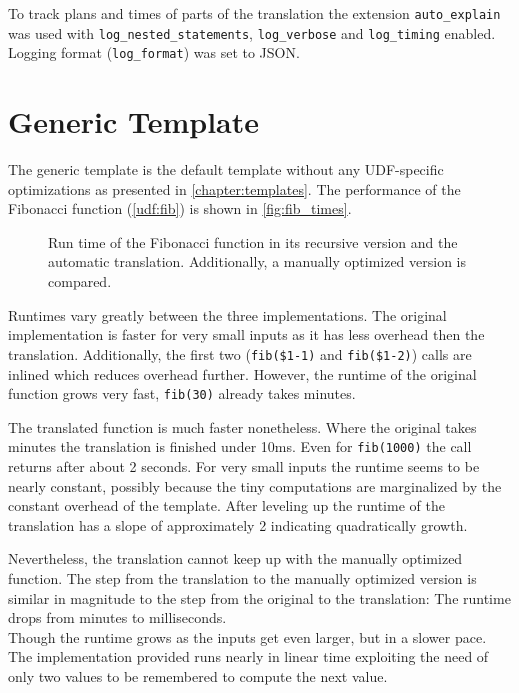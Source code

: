To track plans and times of parts of the translation the extension \texttt{auto\_explain} was used with \texttt{log\_nested\_statements}, \texttt{log\_verbose} and \texttt{log\_timing} enabled. Logging format (\texttt{log\_format}) was set to JSON.

\section{Generic Template}

The generic template is the default template without any UDF-specific optimizations as presented in \autoref{chapter:templates}. The performance of the Fibonacci function (\autoref{udf:fib}) is shown in \autoref{fig:fib_times}.

\begin{figure}[h!]
    \centering\footnotesize
    
    \caption{Run time of the Fibonacci function in its recursive version and the automatic translation. Additionally, a manually optimized version is compared.}
    \label{fig:fib_times}
\end{figure}

Runtimes vary greatly between the three implementations. The original implementation is faster for very small inputs as it has less overhead then the translation. Additionally, the first two (\texttt{fib(\$1-1)} and \texttt{fib(\$1-2)}) calls are inlined which reduces overhead further. However, the runtime of the original function grows very fast, \texttt{fib(30)} already takes minutes.

The translated function is much faster nonetheless. Where the original takes minutes the translation is finished under 10ms. Even for \texttt{fib(1000)} the call returns after about 2 seconds. For very small inputs the runtime seems to be nearly constant, possibly because the tiny computations are marginalized by the constant overhead of the template. After leveling up the runtime of the translation has a slope of approximately 2 indicating quadratically growth.

Nevertheless, the translation cannot keep up with the manually optimized function. The step from the translation to the manually optimized version is similar in magnitude to the step from the original to the translation: The runtime drops from minutes to milliseconds.\\
Though the runtime grows as the inputs get even larger, but in a slower pace. The implementation provided runs nearly in linear time exploiting the need of only two values to be remembered to compute the next value.\\

